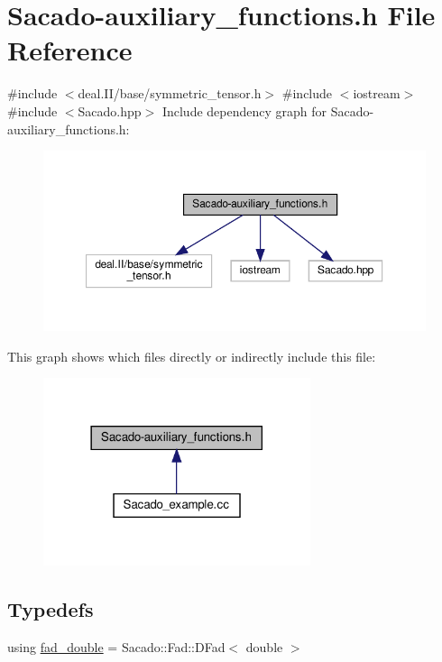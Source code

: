 \hypertarget{Sacado-auxiliary__functions_8h}{}\section{Sacado-\/auxiliary\+\_\+functions.h File Reference}
\label{Sacado-auxiliary__functions_8h}
{\ttfamily \#include $<$deal.\+I\+I/base/symmetric\+\_\+tensor.\+h$>$}\newline
{\ttfamily \#include $<$iostream$>$}\newline
{\ttfamily \#include $<$Sacado.\+hpp$>$}\newline
Include dependency graph for Sacado-\/auxiliary\+\_\+functions.h\+:\nopagebreak
\begin{figure}[H]
\begin{center}
\leavevmode
\includegraphics[width=350pt]{Sacado-auxiliary__functions_8h__incl}
\end{center}
\end{figure}
This graph shows which files directly or indirectly include this file\+:\nopagebreak
\begin{figure}[H]
\begin{center}
\leavevmode
\includegraphics[width=222pt]{Sacado-auxiliary__functions_8h__dep__incl}
\end{center}
\end{figure}
\subsection*{Typedefs}
\begin{DoxyCompactItemize}
\item 
using \hyperlink{Sacado-auxiliary__functions_8h_a868b94676739e612d9c95940e70892a9}{fad\+\_\+double} = Sacado\+::\+Fad\+::\+D\+Fad$<$ double $>$
\end{DoxyCompactItemize}
